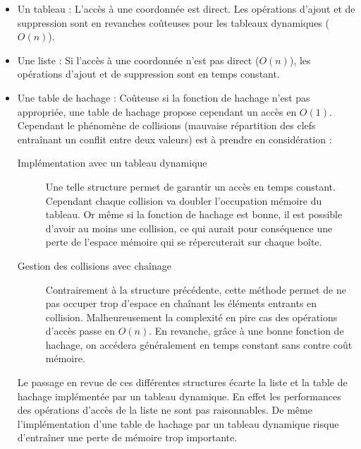 \begin{itemize}
\item
  Un tableau : L'accès à une coordonnée est direct. Les opérations d'ajout et de suppression sont en revanches coûteuses pour les tableaux dynamiques ($O(n)$).
\item
  Une liste : Si l'accès à une coordonnée n'est pas direct ($O(n)$), les opérations d'ajout et de suppression sont en temps constant.
\item
  Une table de hachage : Coûteuse si la fonction de hachage n'est pas appropriée, une table de hachage propose cependant un accès en $O(1)$.  Cependant le phénomène de collisions (mauvaise répartition des clefs entraînant un conflit entre deux valeurs) est à prendre en considération :

\begin{description}
\item[Implémentation avec un tableau dynamique] Une telle structure permet de garantir un accès en temps constant. Cependant chaque collision va doubler l'occupation mémoire du tableau. Or même si la fonction de hachage est bonne, il est possible d'avoir au moins une collision, ce qui aurait pour conséquence une perte de l'espace mémoire qui se répercuterait sur chaque boîte.
\item[Gestion des collisions avec chaînage] Contrairement à la structure précédente, cette méthode permet de ne pas occuper trop d'espace en chaînant les éléments entrants en collision. Malheureusement la complexité en pire cas des opérations d'accès passe en $O(n)$. En revanche, grâce à une bonne fonction de hachage, on accédera généralement en temps constant sans contre coût mémoire. 
\end{description}

Le passage en revue de ces différentes structures écarte la liste et la table de hachage implémentée par un tableau dynamique. En effet les performances des opérations d'accès de la liste ne sont pas raisonnables. De même l'implémentation d'une table de hachage par un tableau dynamique risque d'entraîner une perte de mémoire trop importante.

\end{itemize}

